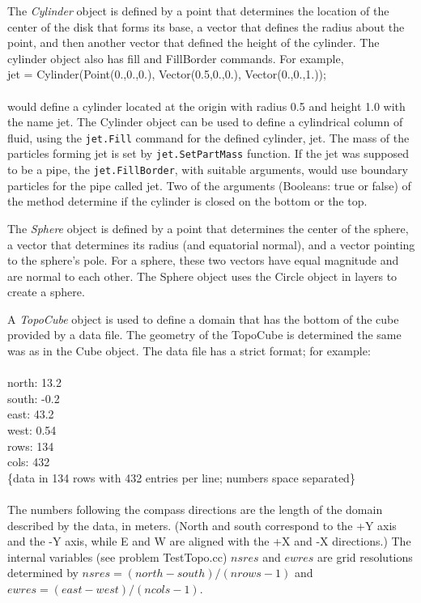 The {\em Cylinder} object is defined by a point that determines the
location of the center of the disk that forms its base, a vector that
defines the radius about the point, and then another vector that defined
the height of the cylinder. The cylinder object also has fill and
FillBorder commands. For example, \\

jet = Cylinder(Point(0.,0.,0.), Vector(0.5,0.,0.), Vector(0.,0.,1.));\\
\\would define a cylinder located at the origin with radius 0.5 and
height 1.0 with the name jet. The Cylinder object can be used to
define a cylindrical column of fluid, using the \verb!jet.Fill!
command for the defined cylinder, jet. The mass of the particles
forming jet is set by \verb!jet.SetPartMass! function. If the jet was
supposed to be a pipe, the \verb!jet.FillBorder!, with suitable
arguments, would use boundary particles for the pipe called jet. Two
of the arguments (Booleans: true or false) of the method determine if
the cylinder is closed on the bottom or the top.

The {\em Sphere} object is defined by a point that determines the center
of the sphere, a vector that determines its radius (and equatorial
normal), and a vector pointing to the sphere's pole. For a sphere,
these two vectors have equal magnitude and are normal to each other.
The Sphere object uses the Circle object in layers to create a sphere.

A {\em TopoCube} object is used to define a domain that has the bottom
of the cube provided by a data file. The geometry of the TopoCube is
determined the same was as in the Cube object. The data file has a
strict format; for example: \\\\ north: 13.2 \\ south: -0.2\\ east:
43.2 \\ west: 0.54 \\ rows: 134\\ cols: 432 \\ \{data in 134 rows
with 432 entries per line; numbers space separated\}\\ \\ The numbers
following the compass directions are the length of the domain described
by the data, in meters. (North and south correspond to the +Y axis and
the -Y axis, while E and W are aligned with the +X and -X directions.)
The internal variables (see problem TestTopo.cc) $nsres$ and $ewres$ are
grid resolutions determined by $nsres= (north-south)/(nrows-1)$ and
$ewres= (east -west)/(ncols-1)$.

